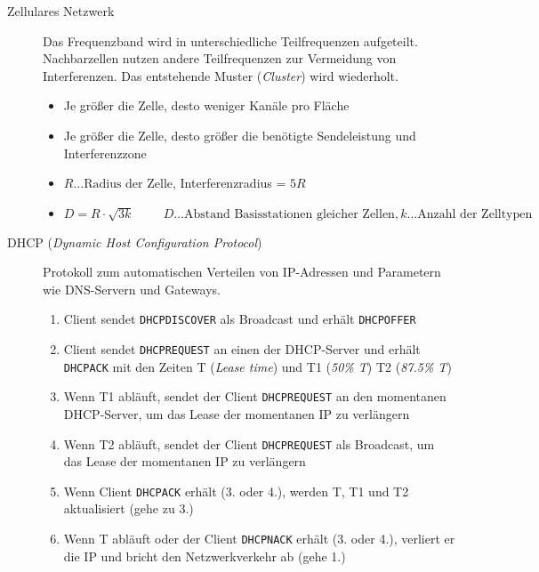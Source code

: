 \documentclass[a4paper]{article}
\newcommand{\hs}[1]{\hspace{#1}}
\begin{document}
\begin{description}
    \item[Zellulares Netzwerk]
    \begin{samepage}
    Das Frequenzband wird in unterschiedliche Teilfrequenzen aufgeteilt. Nachbarzellen nutzen andere Teilfrequenzen zur Vermeidung von Interferenzen. Das entstehende Muster (\textit{Cluster}) wird wiederholt.
    \begin{itemize}
        \item Je größer die Zelle, desto weniger Kanäle pro Fläche
        \item Je größer die Zelle, desto größer die benötigte Sendeleistung und Interferenzzone
        \item $R \ldots \text{Radius der Zelle}$, Interferenzradius = $5R$
        \item $D = R \cdot \sqrt{3k} \hs{1cm} D \ldots \text{Abstand Basisstationen gleicher Zellen}, k \ldots \text{Anzahl der Zelltypen}$
    \end{itemize}
    \end{samepage}
    \item[DHCP (\textit{Dynamic Host Configuration Protocol})]
    \begin{samepage}
    Protokoll zum automatischen Verteilen von IP-Adressen und Parametern wie DNS-Servern und Gateways.
    \begin{enumerate}
        \item Client sendet \texttt{DHCPDISCOVER} als Broadcast und erhält \texttt{DHCPOFFER}
        \item Client sendet \texttt{DHCPREQUEST} an einen der DHCP-Server und erhält \texttt{DHCPACK} mit den Zeiten T (\textit{Lease time}) und T1 (\textit{50\% T}) T2 (\textit{87.5\% T})
        \item Wenn T1 abläuft, sendet der Client \texttt{DHCPREQUEST} an den momentanen DHCP-Server, um das Lease der momentanen IP zu verlängern
        \item Wenn T2 abläuft, sendet der Client \texttt{DHCPREQUEST} als Broadcast, um das Lease der momentanen IP zu verlängern
        \item Wenn Client \texttt{DHCPACK} erhält (3. oder 4.), werden T, T1 und T2 aktualisiert (gehe zu 3.)
        \item Wenn T abläuft oder der Client \texttt{DHCPNACK} erhält (3. oder 4.), verliert er die IP und bricht den Netzwerkverkehr ab (gehe 1.)
    \end{enumerate}
    \end{samepage}

\end{description}
\end{document}
